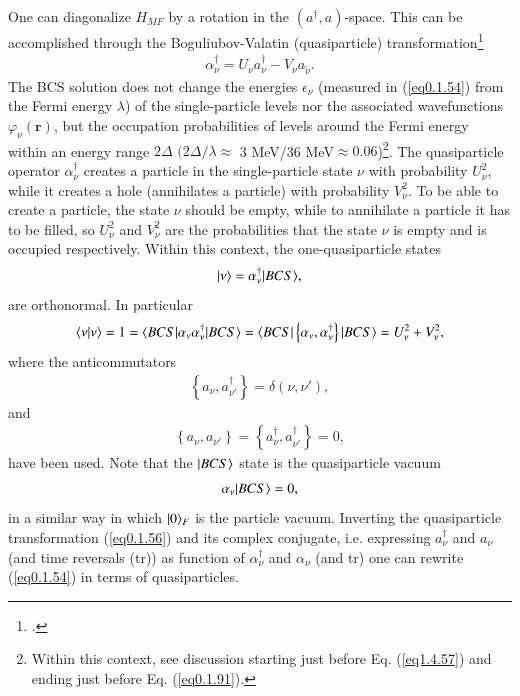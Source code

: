 One can diagonalize $H_{MF}$ by a rotation in the $(a^\dagger,a)$-space. This can be accomplished through the Boguliubov-Valatin (quasiparticle) transformation\footnote{\cite{Bogoljubov:58,Bogoljubov:58b,Valatin:58}.}
\begin{align}\label{eq0.1.56}
\alpha^\dagger_\nu=U_\nu a^\dagger_\nu-V_\nu a_{\tilde\nu}.
\end{align}
The BCS solution does not change the energies $\epsilon_\nu$ (measured in (\ref{eq0.1.54}) from the Fermi energy $\lambda$) of the single-particle levels nor the associated wavefunctions $\varphi_{\nu}(\mathbf r)$, but the occupation probabilities of levels around the Fermi energy within an energy range $2\Delta$ $(2\Delta/\lambda\approx$ 3 MeV/36 MeV$\approx0.06$)\footnote{Within this context, see discussion starting just before Eq. (\ref{eq1.4.57}) and ending just before Eq. (\ref{eq0.1.91}).}. The quasiparticle operator $\alpha^\dagger_\nu$ creates a particle in the single-particle state $\nu$ with probability $U^2_\nu$, while it creates a hole (annihilates a particle) with probability $V^2_\nu$. To be able to create a particle, the state $\nu$ should be empty, while to annihilate a particle it has to be filled, so $U^2_\nu$ and $V^2_\nu$ are the probabilities  that the state $\nu$ is empty and is occupied respectively. Within this context, the one-quasiparticle states   
\begin{align}\label{eq0.1.57}
|{\nu} \rangle=\alpha^\dagger_\nu|{BCS} \rangle,
\end{align}
are orthonormal. In particular
\begin{align}\label{eq0.1.58}
\langle {\nu|\nu} \rangle=1=\langle {BCS|\alpha_{\nu}\alpha^\dagger_\nu|BCS} \rangle=\langle {BCS|\left\{\alpha_{\nu},\alpha^\dagger_\nu\right\}|BCS} \rangle=U^2_\nu+V^2_\nu,
\end{align}
where the anticommutators
\begin{align}\label{eq0.1.59}
\left\{a_{\nu},a^\dagger_{\nu'}\right\}=\delta(\nu,\nu'),
\end{align}
and
\begin{align}\label{eq0.1.60}
\left\{a_{\nu},a_{\nu'}\right\}=\left\{a^\dagger_{\nu},a^\dagger_{\nu'}\right\}=0,
\end{align}
have been used. Note that the $|{BCS} \rangle$ state is the quasiparticle vacuum
\begin{align}\label{eq0.1.61}
\alpha_\nu|{BCS} \rangle=0,
\end{align}
in a similar way in which $|{0} \rangle_F$ is the particle vacuum. Inverting the quasiparticle transformation (\ref{eq0.1.56}) and its complex conjugate, i.e. expressing $a_\nu^\dagger$ and $a_\nu$ (and time reversals (tr)) as function of $\alpha^\dagger_\nu$ and $\alpha_\nu$ (and tr) one can rewrite (\ref{eq0.1.54}) in terms of quasiparticles.

